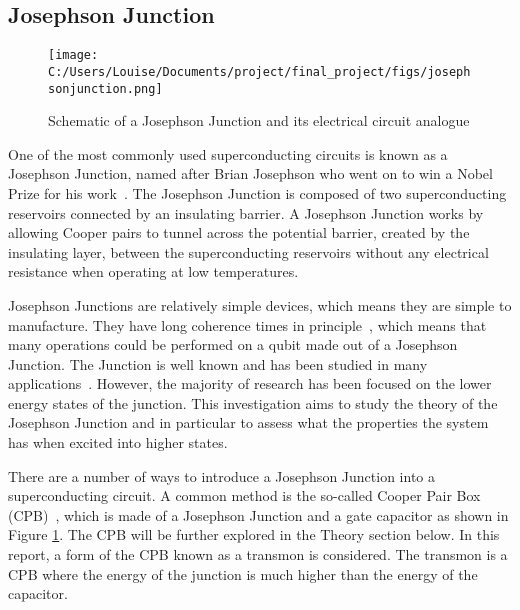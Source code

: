 \documentclass[11pt]{article}
\begin{document}
\subsection{Josephson Junction}
\begin{figure}[ht]
\centering
\texttt{[image: C:/Users/Louise/Documents/project/final\_project/figs/josephsonjunction.png]}
\caption{Schematic of a Josephson Junction and its electrical circuit analogue}
\label{fig:picture1}
\end{figure}
One of the most commonly used superconducting circuits is known as a Josephson Junction, named after Brian Josephson who went on to win a Nobel Prize for his work~\cite{josephsonDiscoveryTunnellingSupercurrents1974,josephsonPossibleNewEffects1962}.
The Josephson Junction is composed of two superconducting reservoirs connected by an insulating barrier.
A Josephson Junction works by allowing Cooper pairs to tunnel across the potential barrier, created by the insulating layer, between the superconducting reservoirs without any electrical resistance when operating at low temperatures.

Josephson Junctions are relatively simple devices, which means they are simple to manufacture. They have long coherence times in principle~\cite{paikObservationHighCoherence2011}, which means that many operations could be performed on a qubit made out of a Josephson Junction. The Junction is well known and has been studied in many applications~\cite{yuCoherentTemporalOscillations2002,simmondsDecoherenceJosephsonPhase2004}. However, the majority of research has been focused on the lower energy states of the junction. This investigation aims to study the theory of the Josephson Junction and in particular to assess what the properties the system has when excited into higher states.

There are a number of ways to introduce a Josephson Junction into a superconducting circuit. A common method is the so-called Cooper Pair Box (CPB)~\cite{bladhSingleCooperpairBox2005}, which is made of a Josephson Junction and a gate capacitor as shown in Figure \ref{fig:picture1}. The CPB will be further explored in the Theory section below. In this report, a form of the CPB known as a transmon is considered. The transmon is a CPB where the energy of the junction is much higher than the energy of the capacitor.
\end{document}
